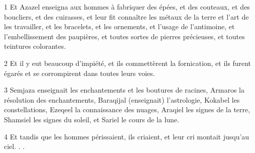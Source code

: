 
\par 1 Et Azazel enseigna aux hommes à fabriquer des épées, et des couteaux, et des boucliers, et des cuirasses, et leur fit connaître les métaux de la terre et l'art de les travailler, et les bracelets, et les ornements, et l'usage de l'antimoine, et l'embellissement des paupières, et toutes sortes de pierres précieuses, et toutes teintures colorantes.
\par 2 Et il y eut beaucoup d'impiété, et ils commettèrent la fornication, et ils furent égarés et se corrompirent dans toutes leurs voies.
\par 3 Semjaza enseignait les enchantements et les boutures de racines, Armaros la résolution des enchantements, Baraqijal (enseignait) l'astrologie, Kokabel les constellations, Ezeqeel la connaissance des nuages, Araqiel les signes de la terre, Shamsiel les signes du soleil, et Sariel le cours de la lune.
\par 4 Et tandis que les hommes périssaient, ils criaient, et leur cri montait jusqu'au ciel. . .


